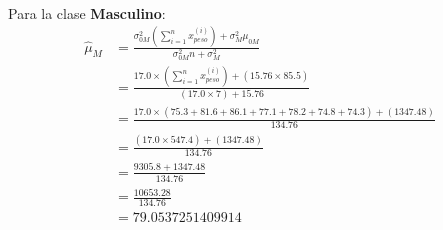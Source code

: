 \documentclass[12pt]{article}
\begin{document}
\paragraph{} Para la clase \textbf{Masculino}:
\begin{equation}
\begin{split}
\hat{\mu}_{M}&=\frac{\sigma_{0M}^2(\sum_{i=1}^{n}{x_{peso}^{(i)}}) + \sigma_M^2\mu_{0M} }{\sigma_{0M}^2n + \sigma_M^2}\\
&=\frac{17.0\times(\sum_{i=1}^{n}{x_{peso}^{(i)}}) + (15.76\times 85.5) }{(17.0 \times 7) + 15.76}\\
&=\frac{17.0\times(75.3 + 81.6 + 86.1 + 77.1 + 78.2 + 74.8 + 74.3) + (1347.48) }{134.76}\\
&=\frac{(17.0\times 547.4) + (1347.48) }{134.76}\\
&=\frac{9305.8 + 1347.48}{134.76}\\
&=\frac{10653.28}{134.76}\\
&= 79.0537251409914\\
\end{split}
\end{equation}
\end{document}
